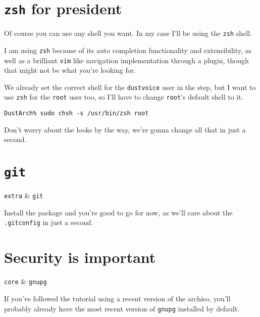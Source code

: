 \documentclass[10pt]{dustdoc}
\begin{document}
\section{\texttt{zsh} for president}
\label{sec:zsh-for-president}

Of course you can use any shell you want.
In my case I’ll be using the \texttt{zsh} shell.

\begin{NOTE}
    I am using \texttt{zsh} because of its auto completion functionality and extensibility, as well as a brilliant \texttt{vim} like navigation implementation through a plugin, though that might not be what you’re looking for.
\end{NOTE}

We already set the correct shell for the \texttt{dustvoice} user in the  step, but I want to use \texttt{zsh} for the \texttt{root} user too, so I’ll have to change \texttt{root}'s default shell to it.

\begin{verbatim}
DustArch% sudo chsh -s /usr/bin/zsh root
\end{verbatim}

Don’t worry about the looks by the way, we’re gonna change all that in just a second.

\section{\texttt{git}}
\label{sec:git}

\begin{packagetable}
    \texttt{extra} & \texttt{git} \\
\end{packagetable}

Install the package and you’re good to go for now, as we’ll care about the \texttt{.gitconfig} in just a second.

\section{Security is important}
\label{sec:security-is-important}

\begin{packagetable}
    \texttt{core} & \texttt{gnupg} \\
\end{packagetable}

If you’ve followed the tutorial using a recent version of the archiso, you’ll probably already have the most recent version of \texttt{gnupg} installed by default.
\end{document}
